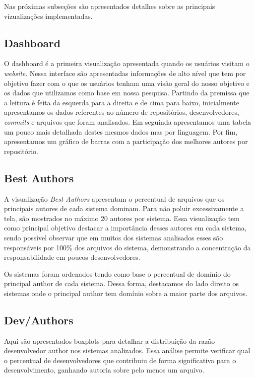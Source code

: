 \documentclass[12pt]{article}
\begin{document}
Nas próximas subseções são apresentados detalhes sobre as principais vizualizações implementadas.

\subsection{Dashboard}

O dashboard é a primeira visualização apresentada quando os usuários visitam o \textit{website}. Nessa interface são apresentadas informações de alto nível que tem por objetivo fazer com o que os usuários tenham uma visão geral do nosso objetivo e os dados que utilizamos como base em nossa pesquisa. Partindo da premissa que a leitura é feita da esquerda para a direita e de cima para baixo, inicialmente apresentamos os dados referentes ao número de repositórios, desenvolvedores, \textit{commits} e arquivos que foram analisados. Em seguinda apresentamos uma tabela um pouco mais detalhada destes mesmos dados mas por linguagem. Por fim, apresentamos um gráfico de barras com a participação dos melhores autores por repositório.

\subsection{Best Authors}

A visualização \textit{Best Authors} apresentam o percentual de arquivos que os principais autores de cada sistema dominam. Para não poluir excessivamente a tela, são mostrados no máximo 20 autores por sistema. Essa visualização tem como principal objetivo destacar a importância desses autores em cada sistema, sendo possível observar que em muitos dos sistemas analisados esses são responsáveis por 100\% dos arquivos do sistema, demonstrando a concentração da responsabilidade em poucos desenvolvedores.

Os sistemas foram ordenados tendo como base o percentual de domínio do principal author de cada sistema. Dessa forma, destacamos do lado direito os sistemas onde o principal author tem domínio sobre a maior parte dos arquivos.

\subsection{Dev/Authors}

Aqui são apresentados boxplots para detalhar a distribuição da razão desenvolvedor author nos sistemas analizados. Essa análise permite verificar qual o percentual de desenvolvedores que contribuiu de forma significativa para o desenvolvimento, ganhando autoria sobre pelo menos um arquivo.
\end{document}
